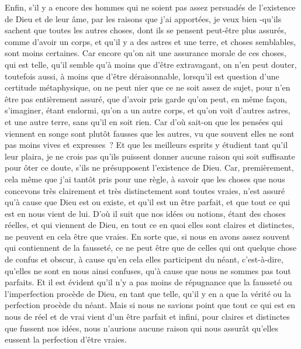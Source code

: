 \documentclass[french,twoside]{book} %
\begin{document}
Enfin, s'il y a encore des hommes qui ne soient pas assez persuadés de l'existence de Dieu et de leur âme, par les raisons que j'ai apportées, je veux bien -qu'ils sachent que toutes les autres choses, dont ils se pensent peut-être plus assurés, comme d'avoir un corps, et qu'il y a des astres et une terre, et choses semblables, sont moins certaines. Car encore qu'on ait une assurance morale de ces choses, qui est telle, qu'il semble qu'à moins que d'être extravagant, on n'en peut douter, toutefois aussi, à moins que d'être déraisonnable, lorsqu'il est question d'une certitude métaphysique, on ne peut nier que ce ne soit assez de sujet, pour n'en être pas entièrement assuré, que d'avoir pris garde qu'on peut, en même façon, s'imaginer, étant endormi, qu'on a un autre corps, et qu'on voit d'autres astres, et une autre terre, sans qu'il en soit rien. Car d'où sait-on que les pensées qui viennent en songe sont plutôt fausses que les autres, vu que souvent elles ne sont pas moins vives et expresses ? Et que les meilleurs esprits y étudient tant qu'il leur plaira, je ne crois pas qu'ils puissent donner aucune raison qui soit suffisante pour ôter ce doute, s'ils ne présupposent l'existence de Dieu. Car, premièrement, cela même que j'ai tantôt pris pour une règle, à savoir que les choses que nous concevons très clairement et très distinctement sont toutes vraies, n'est assuré qu'à cause que Dieu est ou existe, et qu'il est un être parfait, et que tout ce qui est en nous vient de lui. D'où il suit que nos idées ou notions, étant des choses réelles, et qui viennent de Dieu, en tout ce en quoi elles sont claires et distinctes, ne peuvent en cela être que vraies. En sorte que, si nous en avons assez souvent qui contiennent de la fausseté, ce ne peut être que de celles qui ont quelque chose de confus et obscur, à cause qu'en cela elles participent du néant, c'est-à-dire, qu'elles ne sont en nous ainsi confuses, qu'à cause que nous ne sommes pas tout parfaits. Et il est évident qu'il n'y a pas moins de répugnance que la fausseté ou l'imperfection procède de Dieu, en tant que telle, qu'il y en a que la vérité ou la perfection procède du néant. Mais si nous ne savions point que tout ce qui est en nous de réel et de vrai vient d'un être parfait et infini, pour claires et distinctes que fussent nos idées, nous n'aurions aucune raison qui nous assurât qu'elles eussent la perfection d'être vraies.\par
\end{document}
